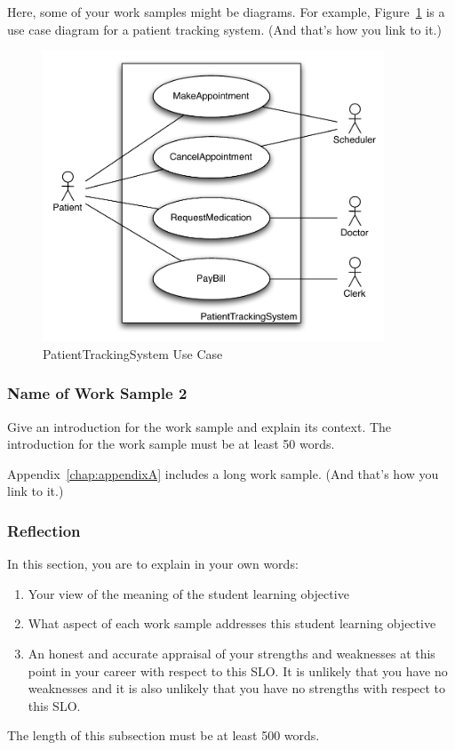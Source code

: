 Here, some of your work samples might be diagrams.  For example,
Figure~\ref{fig:doctorUseCase3} is a use case diagram for a patient tracking
system. (And that's how you link to it.)

\begin{figure}
    \centering
    \includegraphics[width=4in]{figures/DoctorsOfficeUseCase}
    \caption{PatientTrackingSystem Use Case}
    \label{fig:doctorUseCase3}
\end{figure}

\subsubsection{Name of Work Sample 2}
Give an introduction for the work sample and explain its context.  The
introduction for the work sample must be at least 50 words.

Appendix~\ref{chap:appendixA} includes a long work sample.  (And that's how you
link to it.)

\subsubsection{Reflection}
In this section, you are to explain in your own words:
\begin{enumerate}
\item Your view of the meaning of the student learning objective
\item What aspect of each work sample addresses this student learning
      objective
\item An honest and accurate appraisal of your strengths and weaknesses at
      this point in your career with respect to this SLO.  It is unlikely
      that you have no weaknesses and it is also unlikely that you have no
      strengths with respect to this SLO.
\end{enumerate}

The length of this subsection must be at least 500 words.
